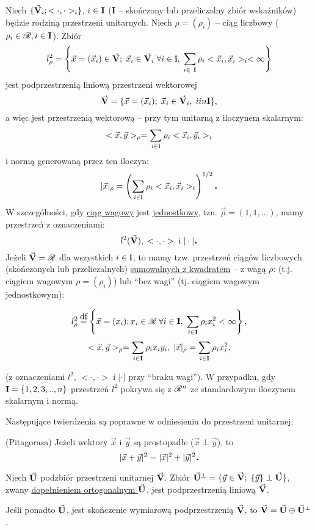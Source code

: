 \begin{example}
   Niech $\{\vec{\mathbf{V}}_i; <\cdot, \cdot>_i\}$, $i \in \mathbf{I}$ ($\mathbf{I}$ -- skończony lub przeliczalny zbiór wskaźników) będzie rodziną przestrzeni unitarnych. Niech $\rho = (\rho_i)$ -- ciąg liczbowy ($\rho_i \in \mathscr{R}, i \in \mathbf{I}$). Zbiór
   \[l^2_\rho = \left\{\vec{x} = (\vec{x}_i) \in \vec{\mathbf{V}}; \; \vec{x}_i \in \vec{\mathbf{V}}_i\; \forall i \in \mathbf{i}, \; \sum\limits_{i \in\ \mathbf{I}} \rho_i <\vec{x}_i, \vec{x}_i>_i < \infty \right\}\]
   jest podprzestrzenią liniową przestrzeni wektorowej
   \[\vec{\mathbf{V}} = \{\vec{x} = (\vec{x}_i); \; \vec{x}_i \in \vec{\mathbf{V}}_i, \; i in \mathbf{I}\},\]
   a więc jest przestrzenią wektorową -- przy tym unitarną z iloczynem skalarnym:
   \[<\vec{x}, \vec{y}>_\rho = \sum\limits_{i\in\mathbf{i}} \rho_i <\vec{x}_i, \vec{y}_i>_i\]
   i normą generowaną przez ten iloczyn:
   \[|\vec{x}|_\rho = \left( \sum\limits_{i\in\mathbf{i}} \rho_i <\vec{x}_i, \vec{x}_i>_i \right)^{1/2} \mbox{\large\bfseries .}\]
   W szczególności, gdy \underline{ciąg wagowy} jest \underline{jednostkowy}, 
   tzn. $\vec{\rho} = (1,1, ...)$, mamy przestrzeń z oznaczeniami:
   \[l^2(\vec{\mathbf{V}}), \; <\cdot, \cdot>\; \text{i}\; |\cdot| \mbox{\large\bfseries .}\]
   Jeżeli $\vec{\mathbf{V}} = \mathscr{R}$ dla wszystkich $i\in\mathbf{i}$, to mamy tzw. przestrzeń ciągów liczbowych (skończonych lub przeliczalnych) \underline{sumowalnych z kwadratem} -- z wagą $\rho$: (t.j. ciągiem wagowym $\rho = (\rho_i)$) lub ``bez wagi'' (tj. ciągiem wagowym jednostkowym):

   \[l^2_\rho \df \left\{ \vec{x} = (x_i); x_i \in\real\; \forall i \in\set{I}, \; \sum\limits_{i\in\set{I}} \rho_i x_i^2 < \infty \right\},\]
   \[ <\vec{x}, \vec{y}>_\rho = \sum\limits_{i\in\mathbf{I}} \rho_i x_i y_i, \; |\vec{x}|_\rho = \sum\limits_{i\in\mathbf{I}} \rho_i x_i^2,\]
   
   (z oznaczeniami $l^2$, $<\cdot, \cdot>$ i $|\cdot|$ przy ``braku wagi'').
   W przypadku, gdy $\mathbf{I} = \{1,2,3,..,n\}$ przestrzeń $l^2$ pokrywa się z $\mathscr{R}^n$ ze standardowym iloczynem skalarnym i normą.
\end{example}

Następujące twierdzenia są poprawne w odniesieniu do przestrzeni unitarnej:
\begin{tw}
   (Pitagorasa) Jeżeli wektory $\vec{x}$ i $\vec{y}$ są prostopadłe ($\vec{x} \perp \vec{y}$), to 
   \[|\vec{x}+\vec{y}|^2 = |\vec{x}|^2 + |\vec{y}|^2 \mbox{\large\bfseries .}\]
\end{tw}

\begin{tw} 
   Niech $\vec{\mathbf{U}}$ podzbiór przestrzeni unitarnej $\vec{\mathbf{V}}$. Zbiór $\vec{\mathbf{U}}^{\perp} = \{\vec{y} \in \vec{\mathbf{V}}; \; \{\vec{y}\} \perp \vec{\mathbf{U}}\}$, zwany \underline{dopełnieniem ortogonalnym $\vec{\mathbf{U}}$}, jest podprzestrzenią liniową $\vec{\mathbf{V}}$.
   
   Jeśli ponadto $\vec{\mathbf{U}}$, jest skończenie wymiarową podprzestrzenią $\vec{\mathbf{V}}$, to $\vec{\mathbf{V}} = \vec{\mathbf{U}} \oplus \vec{\mathbf{U}}^\perp$.
\end{tw}


